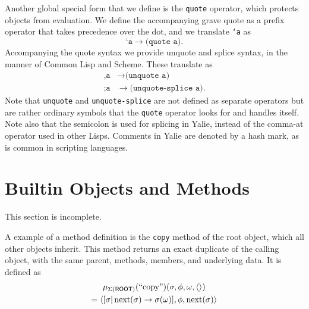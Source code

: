 \documentclass[twocolumn]{article}
\begin{document}
Another global special form that we define is the \texttt{quote}
operator, which protects objects from evaluation. We define the
accompanying grave quote as a prefix operator that takes precedence
over the dot, and we translate \texttt{`a} as
\[ \texttt{`a} \rightarrow \texttt{(quote a)}.\]
Accompanying the quote syntax we provide unquote and splice syntax, in
the manner of Common Lisp and Scheme. These translate as
\begin{align*}
  \texttt{,a} & \rightarrow \texttt{(unquote a)}\\
  \texttt{;a} & \rightarrow \texttt{(unquote-splice a)}.
\end{align*}
Note that \texttt{unquote} and \texttt{unquote-splice} are not defined
as separate operators but are rather ordinary symbols that the
\texttt{quote} operator looks for and handles itself. Note also that
the semicolon is used for splicing in Yalie, instead of the comma-at
operator used in other Lisps. Comments in Yalie are denoted by a hash
mark, as is common in scripting languages.

\section*{Builtin Objects and Methods}

This section is incomplete.

A example of a method definition is the \texttt{copy} method of the
root object, which all other objects inherit. This method returns an
exact duplicate of the calling object, with the same parent, methods,
members, and underlying data. It is defined as
\begin{multline*}
  \mu_{\Sigma(\mathsf{ROOT})}(\text{``copy''})(\sigma,\phi,\omega,
\left<\right>) \\ = \left< [\sigma|\operatorname{next}(\sigma)\rightarrow\sigma(\omega)],\phi,
\operatorname{next}(\sigma)\right>
\end{multline*}



\end{document}
